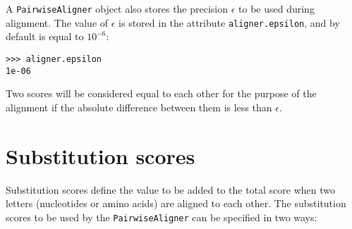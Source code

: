 A \verb+PairwiseAligner+ object also stores the precision $\epsilon$ to be used during alignment. The value of $\epsilon$ is stored in the attribute \verb+aligner.epsilon+, and by default is equal to $10^{-6}$:


\begin{verbatim}
>>> aligner.epsilon
1e-06
\end{verbatim}
Two scores will be considered equal to each other for the purpose of the alignment if the absolute difference between them is less than $\epsilon$.

\section{Substitution scores}
\label{sec:pairwise-substitution-scores}

Substitution scores define the value to be added to the total score when two letters (nucleotides or amino acids) are aligned to each other. The substitution scores to be used by the \verb+PairwiseAligner+ can be specified in two ways:


